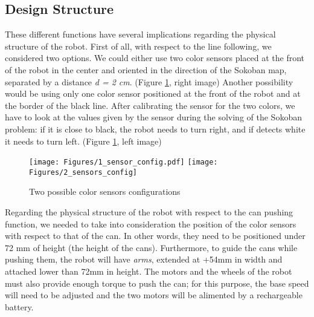 \documentclass[a4paper,12pt]{article}
\begin{document}
%


\subsection{Design Structure}

These different functions have several implications regarding the physical structure of the robot. First of all, with respect to the line following, we considered two options. We could either use two color sensors placed at the front of the robot in the center and oriented in the direction of the Sokoban map, separated by a distance \emph{d = 2 cm}. (Figure \ref{fig:a}, right image)
Another possibility would be using only one color sensor positioned at the front of the robot and at the border of the black line. After calibrating the sensor for the two colors, we have to look at the values given by the sensor during the solving of the Sokoban problem: if it is close to black, the robot needs to turn right, and if detects white it needs to turn left. (Figure \ref{fig:a}, left image)

\begin{figure}[ht]
\centering
\texttt{[image: Figures/1\_sensor\_config.pdf]}
\texttt{[image: Figures/2\_sensors\_config]}
\caption{Two possible color sensors configurations}
\label{fig:a}
\end{figure}


Regarding the physical structure of the robot with respect to the can pushing function, we needed to take into consideration the position of the color sensors with respect to that of the can. In other words, they need to be positioned under 72 mm of height (the height of the cans). Furthermore, to guide the cans while pushing them, the robot will have \emph{arms}, extended at +54mm in width and attached lower than 72mm in height. The motors and the wheels of the robot must also provide enough torque to push the can; for this purpose,  the base speed will need to be adjusted and the two motors will be alimented by a rechargeable battery.
\end{document}
